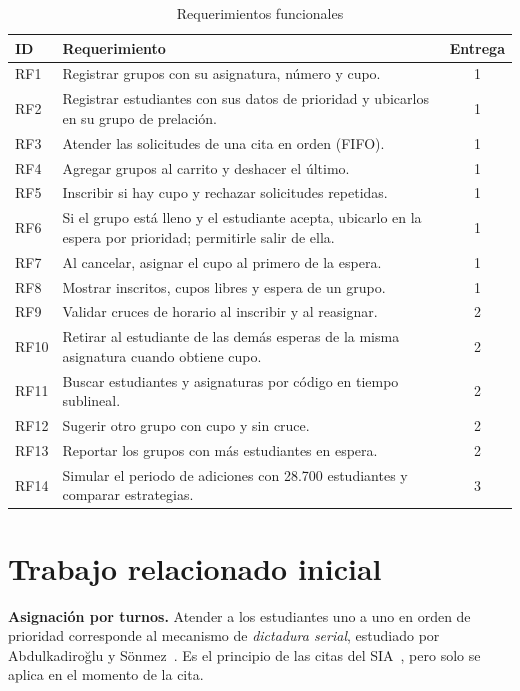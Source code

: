 \documentclass[conference]{IEEEtran}
\begin{document}
\begin{table}[htbp]
\caption{Requerimientos funcionales}
\label{tab:rf}
\centering
\footnotesize
\begin{tabular}{@{}l p{5.4cm} c@{}}
\toprule
\textbf{ID} & \textbf{Requerimiento} & \textbf{Entrega} \\
\midrule
RF1 & Registrar grupos con su asignatura, número y cupo. & 1 \\
RF2 & Registrar estudiantes con sus datos de prioridad y ubicarlos en su grupo de prelación. & 1 \\
RF3 & Atender las solicitudes de una cita en orden (FIFO). & 1 \\
RF4 & Agregar grupos al carrito y deshacer el último. & 1 \\
RF5 & Inscribir si hay cupo y rechazar solicitudes repetidas. & 1 \\
RF6 & Si el grupo está lleno y el estudiante acepta, ubicarlo en la espera por prioridad; permitirle salir de ella. & 1 \\
RF7 & Al cancelar, asignar el cupo al primero de la espera. & 1 \\
RF8 & Mostrar inscritos, cupos libres y espera de un grupo. & 1 \\
RF9 & Validar cruces de horario al inscribir y al reasignar. & 2 \\
RF10 & Retirar al estudiante de las demás esperas de la misma asignatura cuando obtiene cupo. & 2 \\
RF11 & Buscar estudiantes y asignaturas por código en tiempo sublineal. & 2 \\
RF12 & Sugerir otro grupo con cupo y sin cruce. & 2 \\
RF13 & Reportar los grupos con más estudiantes en espera. & 2 \\
RF14 & Simular el periodo de adiciones con 28.700 estudiantes y comparar estrategias. & 3 \\
\bottomrule
\end{tabular}
\end{table}


\section{Trabajo relacionado inicial}

\textbf{Asignación por turnos.} Atender a los estudiantes uno a uno en orden de prioridad corresponde al mecanismo de \emph{dictadura serial}, estudiado por Abdulkadiroğlu y Sönmez~\cite{abdulkadiroglu1998}. Es el principio de las citas del SIA~\cite{circular13}, pero solo se aplica en el momento de la cita.
\end{document}
